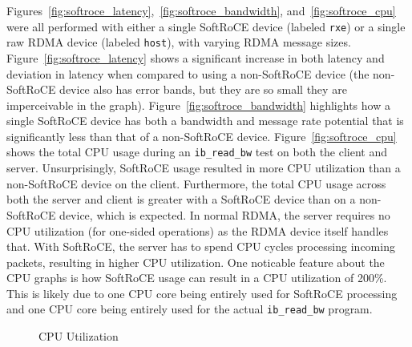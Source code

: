 \documentclass[12pt,titlepage]{article}
\begin{document}
Figures~\ref{fig:softroce_latency},~\ref{fig:softroce_bandwidth}, and~\ref{fig:softroce_cpu} were all performed with either a single SoftRoCE device (labeled \texttt{rxe}) or a single raw RDMA device (labeled \texttt{host}), with varying RDMA message sizes.
Figure~\ref{fig:softroce_latency} shows a significant increase in both latency and deviation in latency when compared to using a non-SoftRoCE device (the non-SoftRoCE device also has error bands, but they are so small they are imperceivable in the graph).
Figure~\ref{fig:softroce_bandwidth} highlights how a single SoftRoCE device has both a bandwidth and message rate potential that is significantly less than that of a non-SoftRoCE device. 
Figure~\ref{fig:softroce_cpu} shows the total CPU usage during an \texttt{ib\_read\_bw} test on both the client and server. 
Unsurprisingly, SoftRoCE usage resulted in more CPU utilization than a non-SoftRoCE device on the client. 
Furthermore, the total CPU usage across both the server and client is greater with a SoftRoCE device than on a non-SoftRoCE device, which is expected.
In normal RDMA, the server requires no CPU utilization (for one-sided operations) as the RDMA device itself handles that.
With SoftRoCE, the server has to spend CPU cycles processing incoming packets, resulting in higher CPU utilization.
One noticable feature about the CPU graphs is how SoftRoCE usage can result in a CPU utilization of 200\%. 
This is likely due to one CPU core being entirely used for SoftRoCE processing and one CPU core being entirely used for the actual \texttt{ib\_read\_bw} program.

\begin{figure}
	\centering
	\caption{CPU Utilization}%
	\label{fig:softroce_multi_vdev}
\end{figure}
\end{document}
